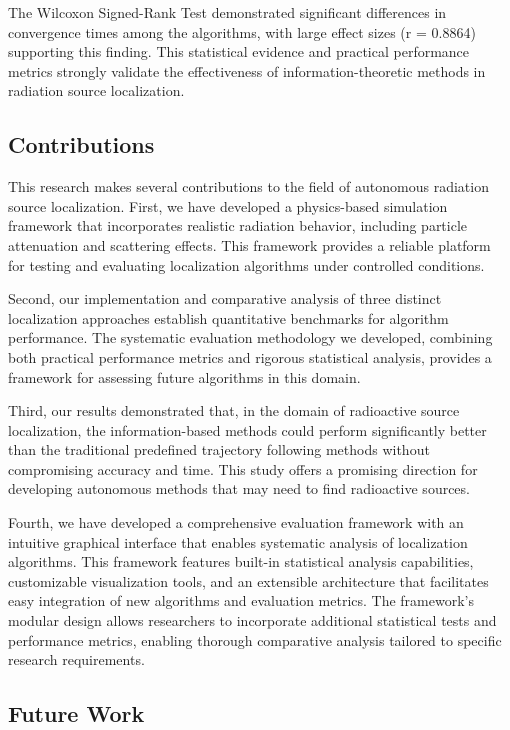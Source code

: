 \documentclass[../report.tex]{subfiles}
\begin{document}
    The Wilcoxon Signed-Rank Test demonstrated significant differences in convergence times among the algorithms, with large effect sizes (r = 0.8864) supporting 
    this finding. This statistical evidence and practical performance metrics strongly validate the effectiveness of information-theoretic methods in radiation 
    source localization.

    \subsection{Contributions}
    \label{sec:conclusions:contributions}

    This research makes several contributions to the field of autonomous radiation source localization. First, we have developed a physics-based 
    simulation framework that incorporates realistic radiation behavior, including particle attenuation and scattering effects. This framework provides a reliable
    platform for testing and evaluating localization algorithms under controlled conditions.

    Second, our implementation and comparative analysis of three distinct localization approaches establish quantitative benchmarks for algorithm performance. 
    The systematic evaluation methodology we developed, combining both practical performance metrics and rigorous statistical analysis, provides a framework 
    for assessing future algorithms in this domain.

    Third, our results demonstrated that, in the domain of radioactive source localization, the information-based methods could perform significantly better than
    the traditional predefined trajectory following methods without compromising accuracy and time. This study offers a promising direction for developing 
    autonomous methods that may need to find radioactive sources.

    Fourth, we have developed a comprehensive evaluation framework with an intuitive graphical interface that enables systematic analysis of localization algorithms.
    This framework features built-in statistical analysis capabilities, customizable visualization tools, and an extensible architecture that facilitates easy 
    integration of new algorithms and evaluation metrics. The framework's modular design allows researchers to incorporate additional statistical tests and 
    performance metrics, enabling thorough comparative analysis tailored to specific research requirements.


    \subsection{Future Work}
    \label{sec:conclusions:future_work}
\end{document}
